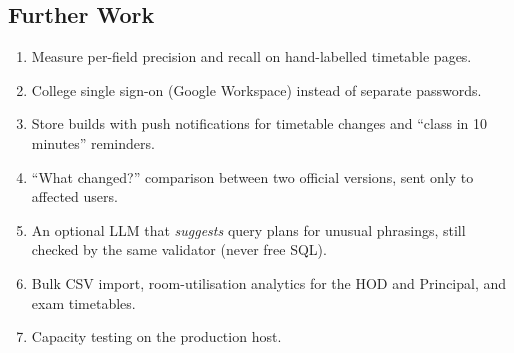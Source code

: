 \subsection{Further Work}
\begin{enumerate}
\item Measure per-field precision and recall on hand-labelled timetable pages.
\item College single sign-on (Google Workspace) instead of separate passwords.
\item Store builds with push notifications for timetable changes and ``class in 10 minutes''
      reminders.
\item ``What changed?'' comparison between two official versions, sent only to affected users.
\item An optional LLM that \emph{suggests} query plans for unusual phrasings, still checked by the same
      validator (never free SQL).
\item Bulk CSV import, room-utilisation analytics for the HOD and Principal, and exam timetables.
\item Capacity testing on the production host.
\end{enumerate}
\newpage
